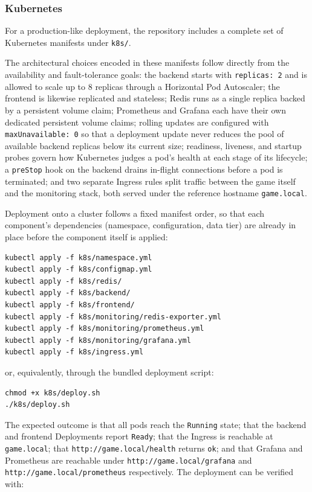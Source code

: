 \documentclass{scrartcl}
\begin{document}
\subsubsection{Kubernetes}

For a production-like deployment, the repository includes a complete set of Kubernetes manifests under \texttt{k8s/}.

The architectural choices encoded in these manifests follow directly from the availability and fault-tolerance goals: the backend starts with \texttt{replicas: 2} and is allowed to scale up to 8 replicas through a Horizontal Pod Autoscaler; the frontend is likewise replicated and stateless; Redis runs as a single replica backed by a persistent volume claim; Prometheus and Grafana each have their own dedicated persistent volume claims; rolling updates are configured with \texttt{maxUnavailable: 0} so that a deployment update never reduces the pool of available backend replicas below its current size; readiness, liveness, and startup probes govern how Kubernetes judges a pod's health at each stage of its lifecycle; a \texttt{preStop} hook on the backend drains in-flight connections before a pod is terminated; and two separate Ingress rules split traffic between the game itself and the monitoring stack, both served under the reference hostname \texttt{game.local}.

Deployment onto a cluster follows a fixed manifest order, so that each component's dependencies (namespace, configuration, data tier) are already in place before the component itself is applied:

\begin{verbatim}
kubectl apply -f k8s/namespace.yml
kubectl apply -f k8s/configmap.yml
kubectl apply -f k8s/redis/
kubectl apply -f k8s/backend/
kubectl apply -f k8s/frontend/
kubectl apply -f k8s/monitoring/redis-exporter.yml
kubectl apply -f k8s/monitoring/prometheus.yml
kubectl apply -f k8s/monitoring/grafana.yml
kubectl apply -f k8s/ingress.yml
\end{verbatim}

or, equivalently, through the bundled deployment script:

\begin{verbatim}
chmod +x k8s/deploy.sh
./k8s/deploy.sh
\end{verbatim}

The expected outcome is that all pods reach the \texttt{Running} state; that the backend and frontend Deployments report \texttt{Ready}; that the Ingress is reachable at \texttt{game.local}; that \texttt{http://game.local/health} returns \texttt{ok}; and that Grafana and Prometheus are reachable under \texttt{http://game.local/grafana} and \texttt{http://game.local/prometheus} respectively. The deployment can be verified with:
\end{document}
